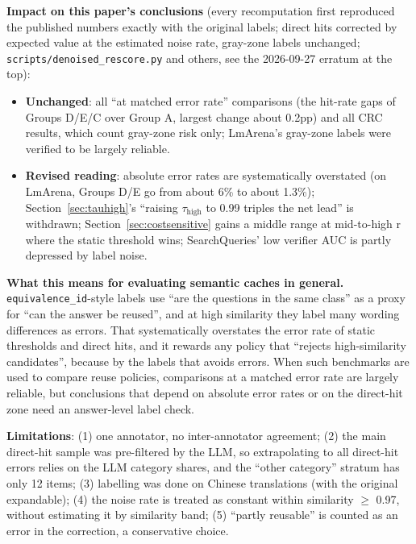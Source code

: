 \documentclass[11pt]{article}
\newcommand{\tauhigh}{\ensuremath{\tau_{\text{high}}}}
\begin{document}
\textbf{Impact on this paper's conclusions} (every recomputation first reproduced the published numbers exactly with the original labels; direct hits corrected by expected value at the estimated noise rate, gray-zone labels unchanged; \texttt{scripts/\allowbreak{}denoised\_\allowbreak{}rescore.\allowbreak{}py} and others, see the 2026-09-27 erratum at the top):
\begin{itemize}[leftmargin=*]
  \item \textbf{Unchanged}: all ``at matched error rate'' comparisons (the hit-rate gaps of Groups D/E/C over Group A, largest change about 0.2pp) and all CRC results, which count gray-zone risk only; LmArena's gray-zone labels were verified to be largely reliable.
  \item \textbf{Revised reading}: absolute error rates are systematically overstated (on LmArena, Groups D/E go from about 6\% to about 1.3\%); Section~\ref{sec:tauhigh}'s ``raising \tauhigh{} to 0.99 triples the net lead'' is withdrawn; Section~\ref{sec:costsensitive} gains a middle range at mid-to-high r where the static threshold wins; SearchQueries' low verifier AUC is partly depressed by label noise.
\end{itemize}

\textbf{What this means for evaluating semantic caches in general.} \texttt{equivalence\_\allowbreak{}id}-style labels use ``are the questions in the same class'' as a proxy for ``can the answer be reused'', and at high similarity they label many wording differences as errors. That systematically overstates the error rate of static thresholds and direct hits, and it rewards any policy that ``rejects high-similarity candidates'', because by the labels that avoids errors. When such benchmarks are used to compare reuse policies, comparisons at a matched error rate are largely reliable, but conclusions that depend on absolute error rates or on the direct-hit zone need an answer-level label check.

\textbf{Limitations}: (1) one annotator, no inter-annotator agreement; (2) the main direct-hit sample was pre-filtered by the LLM, so extrapolating to all direct-hit errors relies on the LLM category shares, and the ``other category'' stratum has only 12 items; (3) labelling was done on Chinese translations (with the original expandable); (4) the noise rate is treated as constant within similarity $\geq$ 0.97, without estimating it by similarity band; (5) ``partly reusable'' is counted as an error in the correction, a conservative choice.
\end{document}
